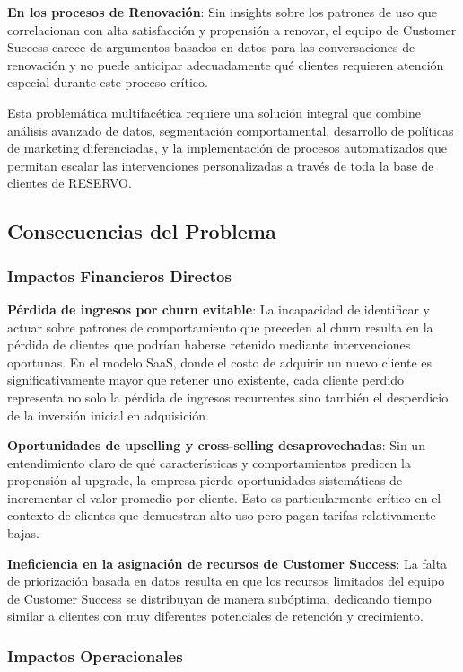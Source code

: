 \textbf{En los procesos de Renovación}: Sin insights sobre los patrones de uso que correlacionan con alta satisfacción y propensión a renovar, el equipo de Customer Success carece de argumentos basados en datos para las conversaciones de renovación y no puede anticipar adecuadamente qué clientes requieren atención especial durante este proceso crítico.

Esta problemática multifacética requiere una solución integral que combine análisis avanzado de datos, segmentación comportamental, desarrollo de políticas de marketing diferenciadas, y la implementación de procesos automatizados que permitan escalar las intervenciones personalizadas a través de toda la base de clientes de RESERVO.

\subsection{Consecuencias del Problema}

\subsubsection{Impactos Financieros Directos}

\textbf{Pérdida de ingresos por churn evitable}: La incapacidad de identificar y actuar sobre patrones de comportamiento que preceden al churn resulta en la pérdida de clientes que podrían haberse retenido mediante intervenciones oportunas. En el modelo SaaS, donde el costo de adquirir un nuevo cliente es significativamente mayor que retener uno existente, cada cliente perdido representa no solo la pérdida de ingresos recurrentes sino también el desperdicio de la inversión inicial en adquisición.

\textbf{Oportunidades de upselling y cross-selling desaprovechadas}: Sin un entendimiento claro de qué características y comportamientos predicen la propensión al upgrade, la empresa pierde oportunidades sistemáticas de incrementar el valor promedio por cliente. Esto es particularmente crítico en el contexto de clientes que demuestran alto uso pero pagan tarifas relativamente bajas.

\textbf{Ineficiencia en la asignación de recursos de Customer Success}: La falta de priorización basada en datos resulta en que los recursos limitados del equipo de Customer Success se distribuyan de manera subóptima, dedicando tiempo similar a clientes con muy diferentes potenciales de retención y crecimiento.

\subsubsection{Impactos Operacionales}

